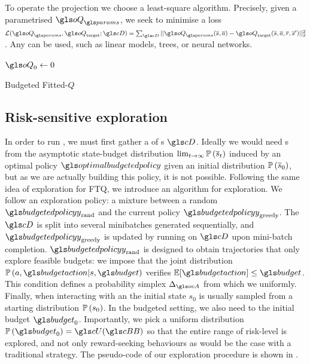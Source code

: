 To operate the projection we choose a least-square  algorithm. Precisely, given a parametrised  $\oQ_{\params}$, we seek to minimise a  loss $\cL(\oQ_{\params}, \oQ_\text{target};\cD) = \sum_{\cD} ||\oQ_{\params}(\os, \oa) - \oQ_\text{target}(\os, \oa, \overline{r}, \os')||_2^2$. Any  can be used, such as linear models,  trees, or neural networks.

\begin{algorithm}[H]
    \DontPrintSemicolon
    \KwData{$\cD$}
    \KwResult{$\oQ^*$}
    $\oQ_{0} \leftarrow 0$\;
    \caption{Budgeted Fitted-$Q$}
    \label{algo:bftq}

\end{algorithm}

\subsection{Risk-sensitive exploration}
\label{sec:exploration}

In order to run , we must first gather a  of s $\cD$. Ideally we would need s from the asymptotic state-budget distribution $\lim_{t\rightarrow\infty}\mathbb{P}\left(\overline{s}_t\right)$ induced by an optimal policy $\optimalbudgetedpolicy$ given an initial distribution $\mathbb{P}\left(\overline{s}_0\right)$, but as we are actually building this policy, it is not possible. Following the same idea of  exploration for \gls{FTQ}, we introduce an algorithm for  exploration. We follow an exploration policy: a mixture between a random  $\budgetedpolicy_\text{rand}$ and the current  policy $\budgetedpolicy_\text{greedy}$. The  $\cD$ is split into several minibatches generated sequentially, and $\budgetedpolicy_\text{greedy}$ is updated by running  on $\cD$ upon mini-batch completion. $\budgetedpolicy_\text{rand}$ is designed to obtain trajectories that only explore feasible budgets: we impose that the joint distribution $\probability{a, \budgetaction|s, \budget}$ verifies $\expectedvalue[\budgetaction]\leq\budget$. This condition defines a probability simplex $\Delta_{\ocA}$ from which we  uniformly. Finally, when interacting with an  the initial state $s_0$ is usually sampled from a starting distribution $\mathbb{P}\left(s_0\right)$. In the budgeted setting, we also need to  the initial budget $\budget_0$. Importantly, we pick a uniform distribution $\probability{\budget_0} = \cU(\budgetspace)$ so that the entire range of risk-level is explored, and not only reward-seeking behaviours as would be the case with a traditional   strategy. The pseudo-code of our exploration procedure is shown in .

